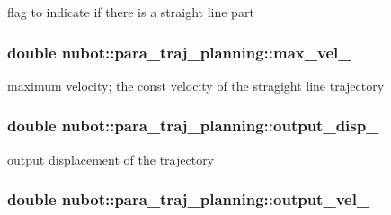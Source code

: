 flag to indicate if there is a straight line part 

\hypertarget{classnubot_1_1para__traj__planning_a1ae8b889bdbb7716e9fbb5821328e4d1}{
\subsubsection[{max\-\_\-vel\-\_\-}]{\setlength{\rightskip}{0pt plus 5cm}double nubot\-::para\-\_\-traj\-\_\-planning\-::max\-\_\-vel\-\_\-\hspace{0.3cm}{\ttfamily [private]}}}\label{classnubot_1_1para__traj__planning_a1ae8b889bdbb7716e9fbb5821328e4d1}


maximum velocity; the const velocity of the stragight line trajectory 

\hypertarget{classnubot_1_1para__traj__planning_a9095bac66ff724f1b9b9c366546f2b36}{
\subsubsection[{output\-\_\-disp\-\_\-}]{\setlength{\rightskip}{0pt plus 5cm}double nubot\-::para\-\_\-traj\-\_\-planning\-::output\-\_\-disp\-\_\-\hspace{0.3cm}{\ttfamily [private]}}}\label{classnubot_1_1para__traj__planning_a9095bac66ff724f1b9b9c366546f2b36}


output displacement of the trajectory 

\hypertarget{classnubot_1_1para__traj__planning_ae57f0165c2b073b880bf4827bdd76204}{
\subsubsection[{output\-\_\-vel\-\_\-}]{\setlength{\rightskip}{0pt plus 5cm}double nubot\-::para\-\_\-traj\-\_\-planning\-::output\-\_\-vel\-\_\-\hspace{0.3cm}{\ttfamily [private]}}}\label{classnubot_1_1para__traj__planning_ae57f0165c2b073b880bf4827bdd76204}


